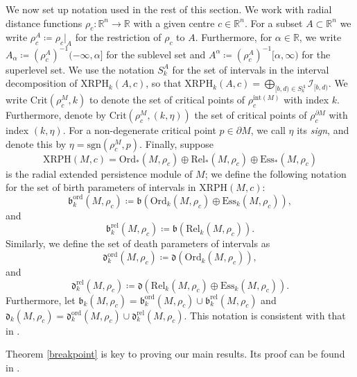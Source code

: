 \documentclass[a4paper,11pt]{article}
\theoremstyle{definition}
\newcommand{\R}{\mathbb{R}}
\begin{document}
We now set up notation used in the rest of this section. We work with radial distance functions $\rho_c:\R^n\to\R$ with a given centre $c\in \R^n$. For a subset $A\subset \R^n$ we write $\rho_c^A\coloneqq \rho_c\vert_A$ for the restriction of $\rho_c$ to $A$. Furthermore, for $\alpha\in \R$, we write $A_\alpha \coloneqq \left(\rho_c^A\right)^{-1}(-\infty,\alpha]$ for the sublevel set and $A^\alpha \coloneqq \left(\rho_c^A\right)^{-1}[\alpha,\infty)$ for the superlevel set.
We use the notation $S_k^A$ for the set of intervals in the interval decomposition of $\mathrm{XRPH}_k(A,c)$, so that 
$\mathrm{XRPH}_k(A,c)=\bigoplus_{[b,d)\in S_k^{A}}\mathcal{I}_{[b,d)}$. 
We write $\text{Crit}(\rho_c^M, k)$ to denote the set of critical points of $\rho_c^{\text{int}(M)}$ with index $k$. Furthermore, denote by $\text{Crit}(\rho_c^M,(k,\eta))$ the set of critical points of $\rho_c^{\partial M}$ with index $(k,\eta)$. For a non-degenerate critical point $p\in \partial M$, we call $\eta$ its \emph{sign}, and denote this by $\eta = \text{sgn}(\rho_c^M, p)$. 
Finally, suppose $$\text{XRPH}(M,c) = \text{Ord}_*(M,\rho_c)\oplus \text{Rel}_*(M,\rho_c) \oplus \text{Ess}_*(M,\rho_c)$$ is the radial extended persistence module of $M$; we define the following notation for the set of birth  parameters of intervals in $\text{XRPH}(M,c)$:
$$\mathfrak{b}_k^\text{ord}(M,\rho_c) \coloneqq \mathfrak{b}\left(\text{Ord}_k(M,\rho_c)\oplus \text{Ess}_k(M,\rho_c)\right),$$ and
$$\mathfrak{b}_k^\text{rel}(M,\rho_c)\coloneqq \mathfrak{b}\left(\text{Rel}_k(M,\rho_c)\right).$$ 
Similarly, we define the set of death parameters of intervals as 
$$\mathfrak{d}_k^\text{ord}(M,\rho_c)\coloneqq \mathfrak{d}\left(\text{Ord}_k(M,\rho_c)\right),$$ and 
$$\mathfrak{d}_k^\text{rel}(M,\rho_c) \coloneqq \mathfrak{d}\left(\text{Rel}_k(M,\rho_c)\oplus \text{Ess}_k(M,\rho_c)\right).$$ Furthermore, let $\mathfrak{b}_k(M,\rho_c) = \mathfrak{b}_k^\mathrm{ord}(M,\rho_c)\cup \mathfrak{b}_k^{\mathrm{rel}}(M,\rho_c)$ and $\mathfrak{d}_k(M,\rho_c) = \mathfrak{d}_k^\mathrm{ord}(M,\rho_c)\cup \mathfrak{d}_k^{\mathrm{rel}}(M,\rho_c)$. This notation is consistent with that in \cite{KT2022}. 


Theorem \ref{breakpoint} is key to proving our main results. Its proof can be found in \cite[Corollary 4.14]{KT2022}.  
\end{document}
